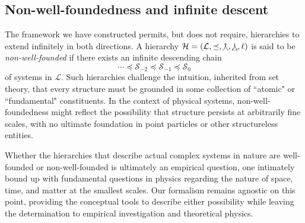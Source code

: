 \subsection{Non-well-foundedness and infinite descent}

The framework we have constructed permits, but does not require, hierarchies to extend infinitely in both directions. A hierarchy $\mathcal{H} = (\mathcal{L}, \preceq, \operatorname*{\curlywedgeuparrow}, \operatorname*{\curlywedgedownarrow}, \ell)$ is said to be \textit{non-well-founded} if there exists an infinite descending chain
\[\cdots \preceq \mathcal{S}_{-2} \preceq \mathcal{S}_{-1} \preceq \mathcal{S}_0\]
of systems in $\mathcal{L}$. Such hierarchies challenge the intuition, inherited from set theory, that every structure must be grounded in some collection of ``atomic" or ``fundamental" constituents. In the context of physical systems, non-well-foundedness might reflect the possibility that structure persists at arbitrarily fine scales, with no ultimate foundation in point particles or other structureless entities.

Whether the hierarchies that describe actual complex systems in nature are well-founded or non-well-founded is ultimately an empirical question, one intimately bound up with fundamental questions in physics regarding the nature of space, time, and matter at the smallest scales. Our formalism remains agnostic on this point, providing the conceptual tools to describe either possibility while leaving the determination to empirical investigation and theoretical physics.
